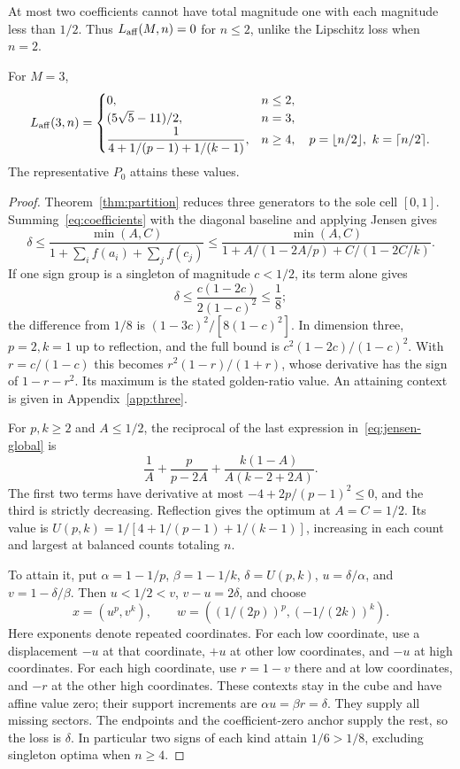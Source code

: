 At most two coefficients cannot have total magnitude one with each magnitude less than $1/2$. Thus $L_{\mathrm{aff}}(M,n)=0$ for $n\le2$, unlike the Lipschitz loss when $n=2$.

\begin{theorem}\label{thm:dimension}
For $M=3$,
\[
L_{\mathrm{aff}}(3,n)=
\begin{cases}
0,&n\le2,\\
(5\sqrt5-11)/2,&n=3,\\
\displaystyle\frac1{4+1/(p-1)+1/(k-1)},&
n\ge4,\quad p=\lfloor n/2\rfloor,\ k=\lceil n/2\rceil .
\end{cases}
\]
The representative $P_0$ attains these values.
\end{theorem}
\begin{proof}
Theorem~\ref{thm:partition} reduces three generators to the sole cell $[0,1]$. Summing~\eqref{eq:coefficients} with the diagonal baseline and applying Jensen gives
\begin{equation}\label{eq:jensen-global}
\delta\le\frac{\min(A,C)}{1+\sum_i f(a_i)+\sum_j f(c_j)}
\le\frac{\min(A,C)}{1+A/(1-2A/p)+C/(1-2C/k)}.
\end{equation}
If one sign group is a singleton of magnitude $c<1/2$, its term alone gives
\[
\delta\le\frac{c(1-2c)}{2(1-c)^2}\le\frac18;
\]
the difference from $1/8$ is $(1-3c)^2/[8(1-c)^2]$. In dimension three, $p=2,k=1$ up to reflection, and the full bound is $c^2(1-2c)/(1-c)^2$. With $r=c/(1-c)$ this becomes $r^2(1-r)/(1+r)$, whose derivative has the sign of $1-r-r^2$. Its maximum is the stated golden-ratio value. An attaining context is given in Appendix~\ref{app:three}.

For $p,k\ge2$ and $A\le1/2$, the reciprocal of the last expression in~\eqref{eq:jensen-global} is
\[
\frac1A+\frac p{p-2A}+\frac{k(1-A)}{A(k-2+2A)}.
\]
The first two terms have derivative at most $-4+2p/(p-1)^2\le0$, and the third is strictly decreasing. Reflection gives the optimum at $A=C=1/2$. Its value is $U(p,k)=1/[4+1/(p-1)+1/(k-1)]$, increasing in each count and largest at balanced counts totaling $n$.

To attain it, put $\alpha=1-1/p$, $\beta=1-1/k$, $\delta=U(p,k)$, $u=\delta/\alpha$, and $v=1-\delta/\beta$. Then $u<1/2<v$, $v-u=2\delta$, and choose
\[
x=(u^p,v^k),\qquad w=((1/(2p))^p,(-1/(2k))^k).
\]
Here exponents denote repeated coordinates. For each low coordinate, use a displacement $-u$ at that coordinate, $+u$ at other low coordinates, and $-u$ at high coordinates. For each high coordinate, use $r=1-v$ there and at low coordinates, and $-r$ at the other high coordinates. These contexts stay in the cube and have affine value zero; their support increments are $\alpha u=\beta r=\delta$. They supply all missing sectors. The endpoints and the coefficient-zero anchor supply the rest, so the loss is $\delta$. In particular two signs of each kind attain $1/6>1/8$, excluding singleton optima when $n\ge4$.
\end{proof}

